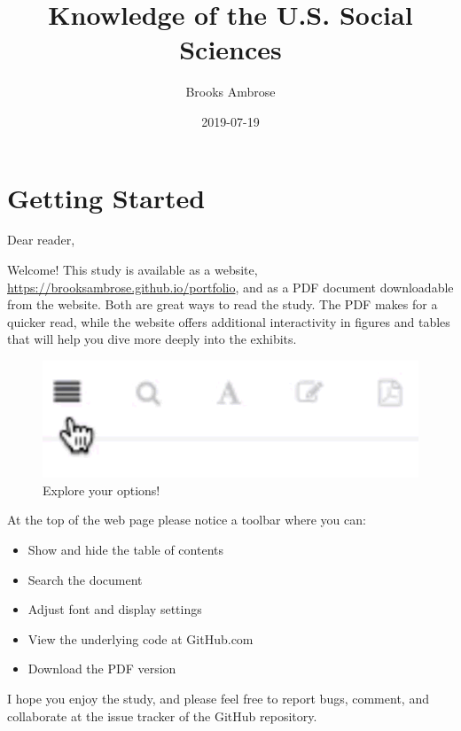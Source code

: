 \documentclass[]{book}
\title{Knowledge of the U.S. Social Sciences}
\author{Brooks Ambrose}
\date{2019-07-19}
\providecommand{\tightlist}{%
  \setlength{\itemsep}{0pt}\setlength{\parskip}{0pt}}
\theoremstyle{definition}
\theoremstyle{definition}
\theoremstyle{definition}
\theoremstyle{remark}
\begin{document}
\maketitle

{
\setcounter{tocdepth}{2}
\tableofcontents
}
\listoftables
\listoffigures
\hypertarget{getting-started}{%
\chapter*{Getting Started}\label{getting-started}}


Dear reader,

Welcome! This study is available as a website,
\url{https://brooksambrose.github.io/portfolio}, and as a PDF document
downloadable from the website. Both are great ways to read the study.
The PDF makes for a quicker read, while the website offers additional
interactivity in figures and tables that will help you dive more deeply
into the exhibits.

\begin{figure}

{\centering \includegraphics[width=6.94in]{img/toolbar} 

}

\caption{Explore your options!}\label{fig:toolbar}
\end{figure}

At the top of the web page please notice a toolbar where you can:

\begin{itemize}
\tightlist
\item
  Show and hide the table of contents
\item
  Search the document
\item
  Adjust font and display settings
\item
  View the underlying code at GitHub.com
\item
  Download the PDF version
\end{itemize}

I hope you enjoy the study, and please feel free to report bugs,
comment, and collaborate at the issue tracker of the GitHub repository.
\end{document}
